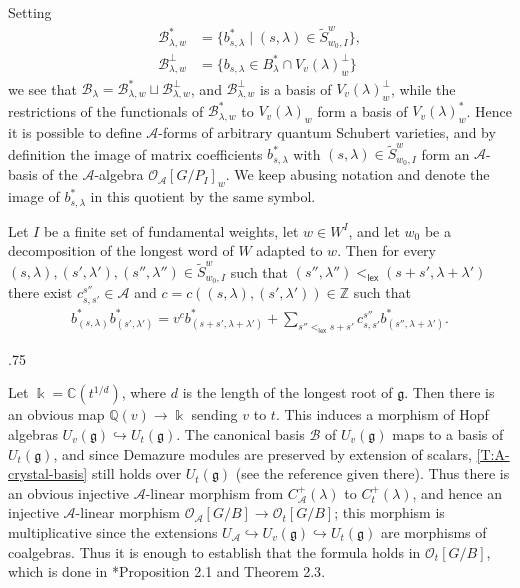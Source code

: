 \documentclass[11pt,fleqn]{article}
\makeatletter
\renewenvironment{proof}[1][\textit{Proof}]{\par
  \pushQED{\qed}%
  \normalfont \topsep.75\paraskip\relax
  \trivlist
  \item[\hskip\labelsep
        \itshape
    #1\@addpunct{.}]\ignorespaces
}{%
  \popQED\endtrivlist\@endpefalse
}
\newcommand\CC{\mathbb C}
\newcommand\QQ{\mathbb Q}
\newcommand\ZZ{\mathbb Z}
\renewcommand\to{\longrightarrow}
\newcommand\A{\mathcal A}
\newcommand\B{\mathcal B}
\renewcommand\O{\mathcal O}
\renewcommand\k{\Bbbk}
\newcommand\g{\mathfrak g}
\newcommand\lex{\mathsf{lex}}
\makeatother
\begin{document}
Setting 
\begin{align*} 
\B_{\lambda, w}^* 
  &= \{b_{s, \lambda}^* \mid (s, \lambda) \in \tilde S_{w_0, I}^w \}, \\ 
\B_{\lambda, w}^\perp 
  &= \{b_{s, \lambda} \in B_\lambda^* \cap V_v(\lambda)_w^\perp\} 
\end{align*} 
we see that $\B_\lambda = \B_{\lambda, w}^* \sqcup \B_{\lambda, w}^\perp$, and 
$\B_{\lambda, w}^\perp$ is a basis of $V_v(\lambda)_w^\perp$, while the restrictions of 
the functionals of $\B_{\lambda, w}^*$ to $V_v(\lambda)_w$ form a basis of 
$V_v(\lambda)_w^*$.  Hence it is possible to define $\A$-forms of arbitrary quantum 
Schubert varieties, and by definition the image of matrix coefficients $b_{s, \lambda}^*$
with $(s, \lambda) \in \tilde S_{w_0, I}^w$ form an $\A$-basis of the $\A$-algebra 
$\O_\A[G/P_I]_w$. We keep abusing notation and denote the image of $b_{s, \lambda}^*$ in 
this quotient by the same symbol.

\begin{Proposition} 
\label{P:basis-product} 
Let $I$ be a finite set of fundamental weights, let $w \in W^I$, and let $w_0$ be a 
decomposition of the longest word of $W$ adapted to $w$. Then for every $(s,
\lambda), (s', \lambda'), (s'', \lambda'') \in \tilde S_{w_0, I}^w$ such that $(s'',
\lambda'') <_{\lex} (s + s', \lambda + \lambda')$ there exist $c_{s, s'}^{s''} \in \A$ 
and $c = c((s,\lambda),(s',\lambda')) \in \ZZ$ such that 
\begin{align}
\label{product-formula} 
b_{(s, \lambda)}^* b_{(s', \lambda')}^* 
  = v^c b_{(s+s', \lambda + \lambda')}^* 
    + \sum_{s'' <_{\lex} s+s'} c_{s,s'}^{s''} b_{(s'', \lambda + \lambda')}^*.  
\end{align} 
\end{Proposition} 
\begin{proof} 
Let $\k = \CC(t^{1/d})$, where $d$ is the length of the longest root of $\g$. Then there
is an obvious map $\QQ(v) \to \k$ sending $v$ to $t$. This induces a morphism of
Hopf algebras $U_v(\g) \hookrightarrow U_t(\g)$. The canonical basis $\B$ of $U_v(\g)$
maps to a basis of $U_t(\g)$, and since Demazure modules are preserved by extension of
scalars, \ref{T:A-crystal-basis} still holds over $U_t(\g)$ (see the reference given
there). Thus there is an obvious injective $\A$-linear morphism from $C_\A^+(\lambda)$ to
$C_t^+(\lambda)$, and hence an injective $\A$-linear morphism $\O_\A[G/B] \to \O_t[G/B]$;
this morphism is multiplicative since the extensions $U_\A \hookrightarrow U_v(\g)
\hookrightarrow U_t(\g)$ are morphisms of coalgebras. Thus it is enough to establish that
the formula holds in $\O_t[G/B]$, which is done in \cite{C}*{Proposition 2.1 and Theorem 
2.3}.
\end{proof} 
\end{document}
